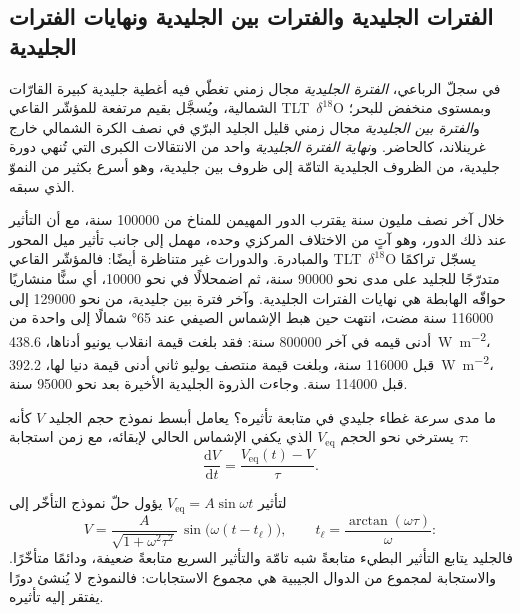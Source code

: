 \subsection*{الفترات الجليدية والفترات بين الجليدية ونهايات الفترات الجليدية}

\begin{definition}\label{def:b2:orbital-forcing:glacials}
في سجلّ الرباعي، \emph{الفترة الجليدية} مجال زمني تغطّي فيه أغطية
جليدية كبيرة القارّات الشمالية، ويُسجَّل بقيم مرتفعة للمؤشّر القاعي \mbox{\textdir TLT $\delta^{18}$O} وبمستوى منخفض للبحر؛
و\emph{الفترة بين الجليدية} مجال زمني قليل الجليد البرّي في نصف الكرة
الشمالي خارج غرينلاند، كالحاضر. و\emph{نهاية الفترة
الجليدية} واحد من الانتقالات الكبرى التي تُنهي دورة جليدية،
من الظروف الجليدية التامّة إلى ظروف بين جليدية، وهو أسرع بكثير من النموّ الذي سبقه.
\end{definition}

خلال آخر نصف مليون سنة يقترب الدور المهيمن للمناخ من \num{100000} سنة،
مع أن التأثير عند ذلك الدور، وهو آتٍ من الاختلاف المركزي وحده، مهمل
إلى جانب تأثير ميل المحور والمبادرة. والدورات غير متناظرة أيضًا: فالمؤشّر القاعي \mbox{\textdir TLT $\delta^{18}$O}
يسجّل تراكمًا متدرّجًا للجليد على مدى نحو \num{90000} سنة، ثم اضمحلالًا في نحو
\num{10000}، أي سنًّا منشاريًا حوافّه الهابطة هي نهايات الفترات الجليدية. وآخر فترة بين جليدية، من
نحو \num{129000} إلى \num{116000} سنة مضت، انتهت حين هبط الإشماس الصيفي عند \ang{65} شمالًا
إلى واحدة من أدنى قيمه في آخر \num{800000} سنة: فقد بلغت قيمة انقلاب يونيو
أدناها، \qty{438.6}{W.m^{-2}}، قبل \num{116000} سنة، وبلغت قيمة منتصف يوليو ثاني أدنى
قيمة دنيا لها، \qty{392.2}{W.m^{-2}}، قبل \num{114000} سنة. وجاءت الذروة الجليدية الأخيرة بعد نحو
\num{95000} سنة.

ما مدى سرعة غطاء جليدي في متابعة تأثيره؟ يعامل أبسط نموذج حجم الجليد $V$ كأنه
يسترخي نحو الحجم $V_{\mathrm{eq}}$ الذي يكفي الإشماس الحالي لإبقائه، مع
زمن استجابة $\tau$:
\[
  \frac{\mathrm dV}{\mathrm dt} = \frac{V_{\mathrm{eq}}(t) - V}{\tau} .
\]

\begin{proposition}\label{prop:b2:orbital-forcing:lag}
لتأثير $V_{\mathrm{eq}} = A\sin\omega t$ يؤول حلّ نموذج التأخّر إلى
\[
  V = \frac{A}{\sqrt{1 + \omega^2\tau^2}}\,\sin\bigl(\omega(t - t_{\ell})\bigr),\qquad
  t_{\ell} = \frac{\arctan(\omega\tau)}{\omega} :
\]
فالجليد يتابع التأثير البطيء متابعةً شبه تامّة والتأثير السريع متابعةً ضعيفة، ودائمًا متأخّرًا. والاستجابة
لمجموع من الدوال الجيبية هي مجموع الاستجابات: فالنموذج لا يُنشئ دورًا يفتقر إليه
تأثيره.
\end{proposition}

